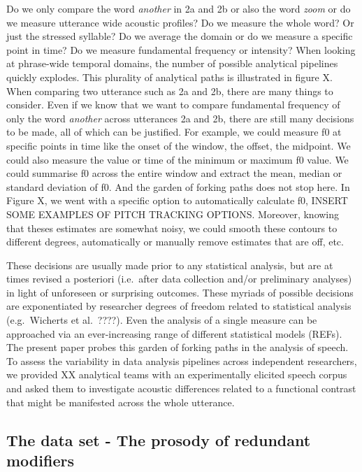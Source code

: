 \documentclass[
  english,
  man,floatsintext]{apa6}
\begin{document}
Do we only compare the word \emph{another} in 2a and 2b or also the word \emph{zoom} or do we measure utterance wide acoustic profiles? Do we measure the whole word? Or just the stressed syllable?
Do we average the domain or do we measure a specific point in time?
Do we measure fundamental frequency or intensity?
When looking at phrase-wide temporal domains, the number of possible analytical pipelines quickly explodes.
This plurality of analytical paths is illustrated in figure X.
When comparing two utterance such as 2a and 2b, there are many things to consider.
Even if we know that we want to compare fundamental frequency of only the word \emph{another} across utterances 2a and 2b, there are still many decisions to be made, all of which can be justified.
For example, we could measure f0 at specific points in time like the onset of the window, the offset, the midpoint.
We could also measure the value or time of the minimum or maximum f0 value.
We could summarise f0 across the entire window and extract the mean, median or standard deviation of f0.
And the garden of forking paths does not stop here.
In Figure X, we went with a specific option to automatically calculate f0, INSERT SOME EXAMPLES OF PITCH TRACKING OPTIONS.
Moreover, knowing that theses estimates are somewhat noisy, we could smooth these contours to different degrees, automatically or manually remove estimates that are off, etc.

These decisions are usually made prior to any statistical analysis, but are at times revised a posteriori (i.e.~after data collection and/or preliminary analyses) in light of unforeseen or surprising outcomes.
These myriads of possible decisions are exponentiated by researcher degrees of freedom related to statistical analysis (e.g.~Wicherts et al.~????).
Even the analysis of a single measure can be approached via an ever-increasing range of different statistical models (REFs).
The present paper probes this garden of forking paths in the analysis of speech.
To assess the variability in data analysis pipelines across independent researchers, we provided XX analytical teams with an experimentally elicited speech corpus and asked them to investigate acoustic differences related to a functional contrast that might be manifested across the whole utterance.

\hypertarget{the-data-set---the-prosody-of-redundant-modifiers}{%
\subsection{The data set - The prosody of redundant modifiers}\label{the-data-set---the-prosody-of-redundant-modifiers}}
\end{document}
